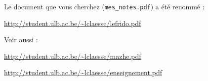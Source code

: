 \documentclass[a4paper,12pt]{article}
\newcommand{\info}[1]{\texttt{#1}}
\begin{document}
Le document que vous cherchez (\info{mes\_notes.pdf}) a été renommé :
\begin{center}
        \url{http://student.ulb.ac.be/~lclaesse/lefrido.pdf}
\end{center}


\vfill

Voir aussi :


        \begin{center}
        \url{http://student.ulb.ac.be/~lclaesse/mazhe.pdf}
        \end{center}



        \begin{center}
        \url{http://student.ulb.ac.be/~lclaesse/enseignement.pdf}
        \end{center}
\end{document}
